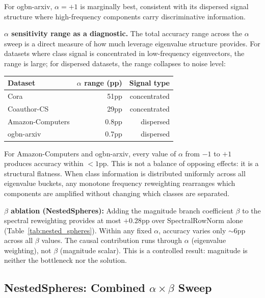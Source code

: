 \documentclass[11pt]{article}
\begin{document}
For ogbn-arxiv, $\alpha{=}+1$ is marginally best, consistent with its dispersed signal
structure where high-frequency components carry discriminative information.

\noindent\textbf{$\alpha$ sensitivity range as a diagnostic.}
The total accuracy range across the $\alpha$ sweep is a direct measure of how much
leverage eigenvalue structure provides.  For datasets where class signal is concentrated
in low-frequency eigenvectors, the range is large; for dispersed datasets, the range
collapses to noise level:

\begin{center}\small
\begin{tabular}{lrr}
\toprule
Dataset & $\alpha$ range (pp) & Signal type \\
\midrule
Cora             & 51pp  & concentrated \\
Coauthor-CS      & 29pp  & concentrated \\
Amazon-Computers & 0.8pp & dispersed \\
ogbn-arxiv       & 0.7pp & dispersed \\
\bottomrule
\end{tabular}
\end{center}

For Amazon-Computers and ogbn-arxiv, every value of $\alpha$ from $-1$ to $+1$
produces accuracy within $<1$pp.  This is not a balance of opposing effects:
it is a structural flatness.  When class information is distributed uniformly
across all eigenvalue buckets, any monotone frequency reweighting rearranges
which components are amplified without changing which classes are separated.

\noindent\textbf{$\beta$ ablation (NestedSpheres):}
Adding the magnitude branch coefficient $\beta$ to the spectral reweighting provides
at most $+0.28$pp over SpectralRowNorm alone (Table~\ref{tab:nested_spheres}).
Within any fixed $\alpha$, accuracy varies only ${\sim}6$pp across all $\beta$ values.
The causal contribution runs through $\alpha$ (eigenvalue weighting), not $\beta$
(magnitude scalar).  This is a controlled result: magnitude is neither the bottleneck
nor the solution.

\subsection{NestedSpheres: Combined $\alpha \times \beta$ Sweep}
\end{document}
